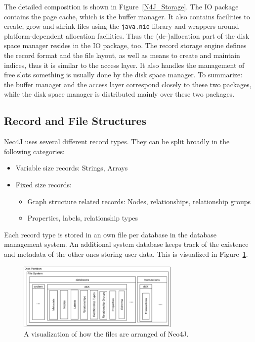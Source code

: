         The detailed composition is shown in Figure~\ref{N4J_Storage}.
        The IO package contains the page cache, which is the buffer manager.
        It also contains facilities to create, grow and shrink files using the \texttt{java.nio} library and wrappers around platform-dependent allocation facilities.
        Thus the (de-)allocation part of the disk space manager resides in the IO package, too.
        The record storage engine defines the record format and the file layout, as well as means to create and maintain indices, thus it is similar to the access layer. 
        It also handles the management of free slots something is usually done by the disk space manager.
        To summarize: the buffer manager and the access layer correspond closely to these two packages, while the disk space manager is distributed mainly over these two packages.        

    \subsection{Record and File Structures}\label{n4j-struct}
        Neo4J uses several different record types. They can be split broadly in the following categories:
        \begin{itemize}
            \item Variable size records: Strings, Arrays
            \item Fixed size records:
            \begin{itemize}
            \item Graph structure related records: Nodes, relationships, relationship groups
            \item Properties, labels, relationship types
            \end{itemize}
        \end{itemize}
        
        Each record type is stored in an own file per database in the database management system.
        An additional system database keeps track of the existence and metadata of the other ones storing user data.
        This is visualized in Figure~\ref{n4j-disk}.
        \begin{figure}[htp]
            \begin{center}
                \includegraphics[keepaspectratio,height=0.4\textheight,width=0.7\textwidth]{img/04-databases/N4J_disk_view.png}
            \end{center}
            \caption{A visualization of how the files are arranged of Neo4J.}
            \label{n4j-disk}
        \end{figure}
        
